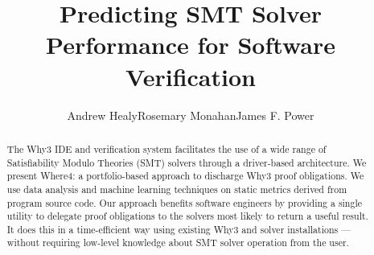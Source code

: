 \documentclass[submission,copyright,creativecommons]{eptcs}
\newcommand{\keywords}[1]{\par\addvspace\baselineskip
\noindent\keywordname\enspace\ignorespaces#1}
\begin{document}

\title{Predicting SMT Solver Performance for Software Verification}


%
%
\author{Andrew Healy\quad\quad Rosemary Monahan\quad\quad  James F. Power
%
}
\def\titlerunning{Predicting SMT Solver Performance for Software Verification}
\def\authorrunning{A. Healy, R. Monahan \& J. F. Power}




%
%

\maketitle


\begin{abstract}
The \textsf{Why3} IDE and verification system facilitates the use of a wide range of Satisfiability Modulo Theories (SMT) solvers through a driver-based architecture. We present \textsf{Where4}: a portfolio-based approach to discharge \textsf{Why3} proof obligations. We use data analysis and machine learning techniques on static metrics derived from program source code. Our approach benefits software engineers by providing a single utility to delegate proof obligations to the solvers most likely to return a useful result. It does this in a time-efficient way using existing \textsf{Why3} and solver installations --- without requiring low-level knowledge about SMT solver operation from the user.
\end{abstract}
\end{document}
